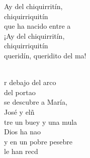 \begin{cancion}[Chiquirritín][]%
	\begin{chorus}%
	Ay del chiquirritín,\\
chiquirriquitín\\
	que ha nacido entre a\\
¡Ay del chiquirritín, \\
chiquirriquitín\\
	queridín, queridito del ma!\\
	\end{chorus}%
	\jump\\
	r debajo del arco \\
	del portao\\
se descubre a María, \\
	José y elñ \\
\jump
	tre un buey y una mula\\
	Dios ha nao\\
y en un pobre pesebre \\
	le han recd\\
\end{cancion}%

